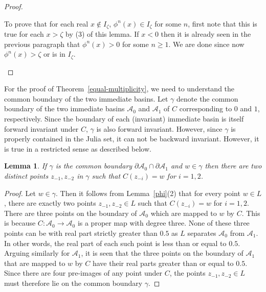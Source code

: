 \documentclass[12pt]{article}
\newtheorem{lem}{Lemma}[section]
\begin{document}
\begin{proof}
\begin{enumerate}
\par To prove that for each real $x \notin I_\zeta$, $\phi^n (x) \in I_\zeta$ for some $n$, first note that this is true for each $x> \zeta$ by (3) of this lemma. If $x< 0$ then it is already seen in the previous paragraph that $\phi^{n}(x)>0$ for some $n\geq 1$. We are done since now $\phi^{n}(x)>\zeta$ or is in $I_\zeta$.\end{enumerate}
\end{proof}
For the proof of Theorem~\ref{equal-multiplicity}, we need to understand the common boundary of the two immediate basins.  
 Let $\gamma$ denote the common boundary of the two immediate basins $\mathcal{A}_0$ and $ \mathcal{A}_1$ of $C$ corresponding to $0$ and $1$, respectively. Since the boundary of each (invariant) immediate basin is itself forward invariant under $C$,  $\gamma$ is also forward invariant. However, since $\gamma$ is properly contained in the Julia set, it can not be backward invariant. However,   it is true in a restricted sense as described below.
 \begin{lem}
 	If $\gamma$ is the common boundary  $\partial \mathcal{A}_0 \cap \partial \mathcal{A}_1$ and $w \in \gamma$ then there are   two distinct points $z_{-1}, z_{-2}$ in $\gamma$ such that $C(z_{-i})=w$ for $i=1,2$.
 \label{common-boundary-backwardinvariant}
 \end{lem}
 \begin{proof}
 	 Let $w \in \gamma$. Then it follows from Lemma~\ref{phi}(2) that for every point $w \in L$, there are exactly two points $z_{-1}, z_{-2} \in L$
 	such that $C (z_{-i})=w$ for $i=1,2$.  There are three points on the boundary of $\mathcal{A}_0$ which are mapped to $w$ by $C$. This is because $C: \mathcal{A}_0 \to \mathcal{A}_0$ is a proper map with degree three. None of these three points can be with real part strictly greater than $0.5$ as $L$ separates $\mathcal{A}_0$ from  $\mathcal{A}_1$. In other words, the real part of each such point is less than or equal to $0.5$. Arguing similarly for $\mathcal{A}_1$, it is seen that the three points on the boundary of $\mathcal{A}_1$ that are mapped to $w$ by $C$  have their real parts greater than or equal to $0.5$. Since there are four pre-images of any point under $C$, the points  $z_{-1}, z_{-2} \in L$ must therefore lie on the common boundary  $\gamma$.
 \end{proof}
% 
 
\end{document}
